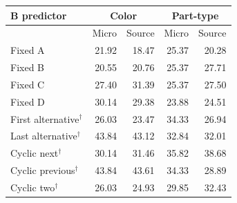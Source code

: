 \begin{tabular}{@{}lrrrr@{}}
\toprule
B predictor & \multicolumn{2}{c}{Color} & \multicolumn{2}{c}{Part-type}\\
\midrule
 & Micro & Source & Micro & Source\\
Fixed A & 21.92 & 18.47 & 25.37 & 20.28\\
Fixed B & 20.55 & 20.76 & 25.37 & 27.71\\
Fixed C & 27.40 & 31.39 & 25.37 & 27.50\\
Fixed D & 30.14 & 29.38 & 23.88 & 24.51\\
First alternative$^\dagger$ & 26.03 & 23.47 & 34.33 & 26.94\\
Last alternative$^\dagger$ & 43.84 & 43.12 & 32.84 & 32.01\\
Cyclic next$^\dagger$ & 30.14 & 31.46 & 35.82 & 38.68\\
Cyclic previous$^\dagger$ & 43.84 & 43.61 & 34.33 & 28.89\\
Cyclic two$^\dagger$ & 26.03 & 24.93 & 29.85 & 32.43\\
\bottomrule
\end{tabular}
